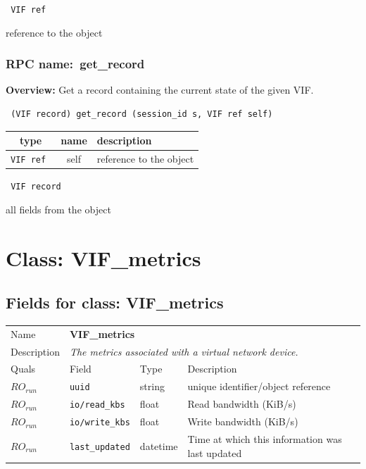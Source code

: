 {\tt 
VIF ref
}


reference to the object
\vspace{0.3cm}
\vspace{0.3cm}
\vspace{0.3cm}
\subsubsection{RPC name:~get\_record}

{\bf Overview:} 
Get a record containing the current state of the given VIF.

\begin{verbatim} (VIF record) get_record (session_id s, VIF ref self)\end{verbatim}



 
\vspace{0.3cm}
\begin{tabular}{|c|c|p{7cm}|}
 \hline
{\bf type} & {\bf name} & {\bf description} \\ \hline
{\tt VIF ref } & self & reference to the object \\ \hline 

\end{tabular}

\vspace{0.3cm}

{\tt 
VIF record
}


all fields from the object
\vspace{0.3cm}
\vspace{0.3cm}
\vspace{0.3cm}

\vspace{1cm}
\newpage
\section{Class: VIF\_metrics}
\subsection{Fields for class: VIF\_metrics}
\begin{longtable}{|lllp{}|}
\hline
\multicolumn{1}{|l}{Name} & \multicolumn{3}{l|}{\bf VIF\_metrics} \\
\multicolumn{1}{|l}{Description} & \multicolumn{3}{l|}{\parbox{11cm}{\em
The metrics associated with a virtual network device.}} \\
\hline
Quals & Field & Type & Description \\
\hline
$\mathit{RO}_\mathit{run}$ &  {\tt uuid} & string & unique identifier/object reference \\
$\mathit{RO}_\mathit{run}$ &  {\tt io/read\_kbs} & float & Read bandwidth (KiB/s) \\
$\mathit{RO}_\mathit{run}$ &  {\tt io/write\_kbs} & float & Write bandwidth (KiB/s) \\
$\mathit{RO}_\mathit{run}$ &  {\tt last\_updated} & datetime & Time at which this information was last updated \\
\hline
\end{longtable}
